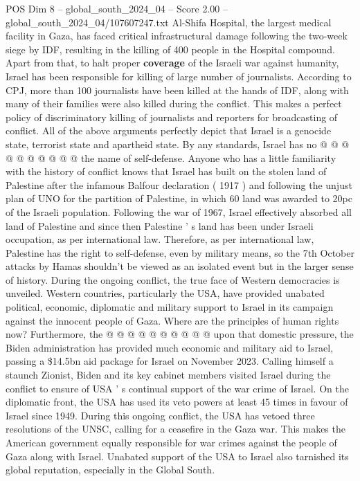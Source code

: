 \begin{textsample}{POS Dim 8 – global\_south\_2024\_04 – Score 2.00 – global\_south\_2024\_04/107607247.txt}
Al-Shifa Hospital, the largest medical facility in Gaza, has faced critical infrastructural damage following the two-week siege by IDF, resulting in the killing of 400 people in the Hospital compound.
Apart from that, to halt proper \textbf{coverage} of the Israeli war against humanity, Israel has been responsible for killing of large number of journalists.
According to CPJ, more than 100 journalists have been killed at the hands of IDF, along with many of their families were also killed during the conflict.
This makes a perfect policy of discriminatory killing of journalists and reporters for broadcasting of conflict.
All of the above arguments perfectly depict that Israel is a genocide state, terrorist state and apartheid state.
By any standards, Israel has no @ @ @ @ @ @ @ @ @ @ the name of self-defense.
Anyone who has a little familiarity with the history of conflict knows that Israel has built on the stolen land of Palestine after the infamous Balfour declaration ( 1917 ) and following the unjust plan of UNO for the partition of Palestine, in which 60 land was awarded to 20pc of the Israeli population.
Following the war of 1967, Israel effectively absorbed all land of Palestine and since then Palestine ' s land has been under Israeli occupation, as per international law.
Therefore, as per international law, Palestine has the right to self-defense, even by military means, so the 7th October attacks by Hamas shouldn't be viewed as an isolated event but in the larger sense of history.
During the ongoing conflict, the true face of Western democracies is unveiled.
Western countries, particularly the USA, have provided unabated political, economic, diplomatic and military support to Israel in its campaign against the innocent people of Gaza.
Where are the principles of human rights now?
Furthermore, the @ @ @ @ @ @ @ @ @ @ upon that domestic pressure, the Biden administration has provided much economic and military aid to Israel, passing a \$14.5bn aid package for Israel on November 2023.
Calling himself a staunch Zionist, Biden and its key cabinet members visited Israel during the conflict to ensure of USA ' s continual support of the war crime of Israel.
On the diplomatic front, the USA has used its veto powers at least 45 times in favour of Israel since 1949.
During this ongoing conflict, the USA has vetoed three resolutions of the UNSC, calling for a ceasefire in the Gaza war.
This makes the American government equally responsible for war crimes against the people of Gaza along with Israel.
Unabated support of the USA to Israel also tarnished its global reputation, especially in the Global South.

\end{textsample}
